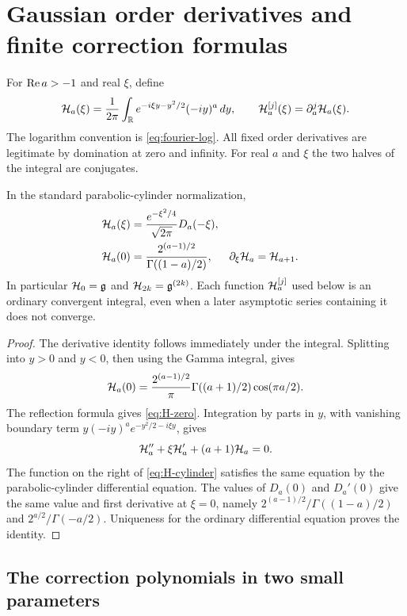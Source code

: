 \section{Gaussian order derivatives and finite correction formulas}
\label{sec:kernels}

For $\operatorname{Re} a>-1$ and real $\xi$, define
\begin{equation}\label{eq:H-definition}
 \mathcal H_a(\xi)=\frac1{2\pi}\int_{\mathbb R}
     e^{-i\xi y-y^2/2}(-iy)^a\,dy,
 \qquad \mathcal H_a^{[j]}(\xi)=\partial_a^j\mathcal H_a(\xi).
\end{equation}
The logarithm convention is \eqref{eq:fourier-log}. All fixed order
derivatives are legitimate by domination at zero and infinity. For
real $a$ and $\xi$ the two halves of the integral are conjugates.

\begin{proposition}
\label{prop:H}
In the standard parabolic-cylinder normalization,
\begin{align}
 \mathcal H_a(\xi)&=\frac{e^{-\xi^2/4}}{\sqrt{2\pi}}D_a(-\xi),
       \label{eq:H-cylinder}\\
 \mathcal H_a(0)&=\frac{2^{(a-1)/2}}{\Gamma((1-a)/2)},
 &\partial_\xi\mathcal H_a&=\mathcal H_{a+1}.
       \label{eq:H-zero}
\end{align}
In particular $\mathcal H_0=\mathfrak g$ and
$\mathcal H_{2k}=\mathfrak g^{(2k)}$. Each function
$\mathcal H_a^{[j]}$ used below is an ordinary convergent integral, even
when a later asymptotic series containing it does not converge.
\end{proposition}

\begin{proof}
The derivative identity follows immediately under the integral.
Splitting into $y>0$ and $y<0$, then using the Gamma integral,
gives
\[
 \mathcal H_a(0)=\frac{2^{(a-1)/2}}{\pi}
       \Gamma((a+1)/2)\cos(\pi a/2).
\]
The reflection formula gives \eqref{eq:H-zero}. Integration by
parts in $y$, with vanishing boundary term
$y(-iy)^ae^{-y^2/2-i\xi y}$, gives
\[
 \mathcal H_a''+\xi\mathcal H_a'+(a+1)\mathcal H_a=0.
\]
The function on the right of \eqref{eq:H-cylinder} satisfies the same
equation by the parabolic-cylinder differential equation.
The values of $D_a(0)$ and $D_a'(0)$
\cite[12.2.4--12.2.7]{dlmf-cylinder} give the same value and first
derivative at $\xi=0$, namely
$2^{(a-1)/2}/\Gamma((1-a)/2)$ and
$2^{a/2}/\Gamma(-a/2)$. Uniqueness for the ordinary differential
equation proves the identity.
\end{proof}

\subsection{The correction polynomials in two small parameters}

